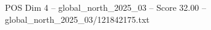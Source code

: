 \begin{textsample}{POS Dim 4 – global\_north\_2025\_03 – Score 32.00 – global\_north\_2025\_03/121842175.txt}
\end{textsample}
